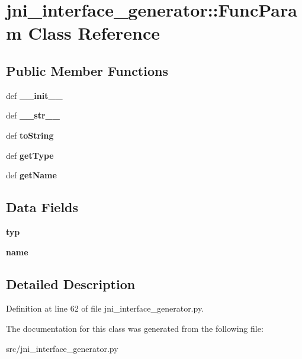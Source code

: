 \section{jni\_\-interface\_\-generator::FuncParam Class Reference}
\label{classjni__interface__generator_1_1_func_param}
\subsection*{Public Member Functions}
\begin{DoxyCompactItemize}
\item 
def {\bfseries \_\-\_\-init\_\-\_\-}\label{classjni__interface__generator_1_1_func_param_a99766b365e4caea577a6914b4d76aa2e}

\item 
def {\bfseries \_\-\_\-str\_\-\_\-}\label{classjni__interface__generator_1_1_func_param_ab7a576be6f7999d798e1ccababfd1a2a}

\item 
def {\bfseries toString}\label{classjni__interface__generator_1_1_func_param_ab70dda9567947e8f744105b3b0c0180b}

\item 
def {\bfseries getType}\label{classjni__interface__generator_1_1_func_param_a09289d50e6cb0a9fc88df1952372559e}

\item 
def {\bfseries getName}\label{classjni__interface__generator_1_1_func_param_a706deaa1d90d6d2834debb60187999dc}

\end{DoxyCompactItemize}
\subsection*{Data Fields}
\begin{DoxyCompactItemize}
\item 
{\bfseries typ}\label{classjni__interface__generator_1_1_func_param_a22d21e5dbf58752f0bd81d966db53055}

\item 
{\bfseries name}\label{classjni__interface__generator_1_1_func_param_a25cd3e8ff7eebfc8b57a27cc027aba1f}

\end{DoxyCompactItemize}


\subsection{Detailed Description}


Definition at line 62 of file jni\_\-interface\_\-generator.py.



The documentation for this class was generated from the following file:\begin{DoxyCompactItemize}
\item 
src/jni\_\-interface\_\-generator.py\end{DoxyCompactItemize}
